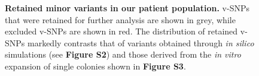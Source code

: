 \documentclass[12pt, oneside]{article}   	%
\begin{document}
\begin{figure}
\centering
{}
\label{fig:supfig4}
\caption{\textbf{Retained minor variants in our patient population.} v-SNPs that were retained for further analysis are shown in grey, while excluded v-SNPs are shown in red. The distribution of retained v-SNPs markedly contrasts that of variants obtained through \emph{in silico} simulations (see \textbf{Figure S2}) and those derived from the \emph{in vitro} expansion of single colonies shown in \textbf{Figure S3}.}
\end{figure}

\newpage
\end{document}
